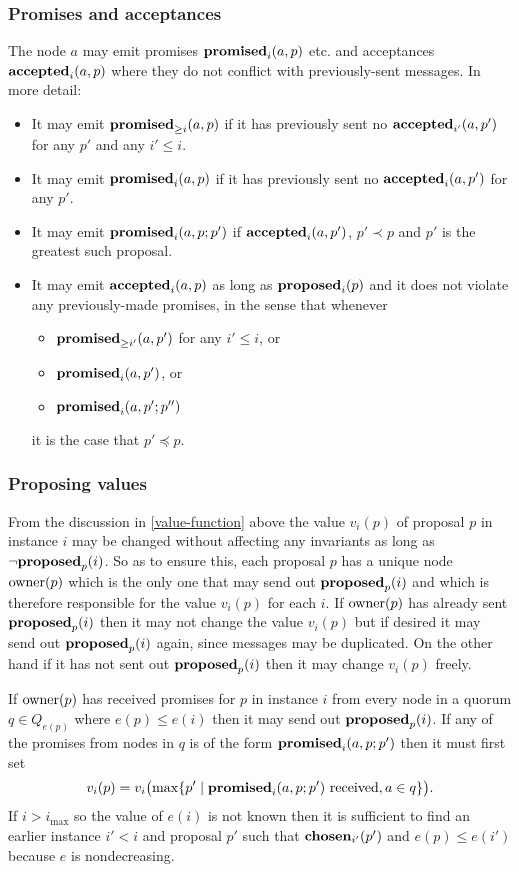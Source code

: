 \documentclass[journal]{IEEEtran}
\begin{document}
\subsubsection{Promises and acceptances} The node $a$ may emit promises
$\mathbf{promised}_{i}(a,p)$ etc. and acceptances $\mathbf{accepted}_{i}(a,p)$ where they do not
conflict with previously-sent messages. In more detail: \begin{itemize} \item
It may emit $\mathbf{promised}_{\ge i}(a,p)$ if it has previously sent no $\mathbf{accepted}_{i'}(a,p')$
for any $p'$ and any $i' \le i$. \item It may emit $\mathbf{promised}_{i}(a,p)$ if it has
previously sent no $\mathbf{accepted}_{i}(a,p')$ for any $p'$. \item It may emit
$\mathbf{promised}_{i}(a,p;p')$ if $\mathbf{accepted}_{i}(a,p')$, $p' \prec p$ and $p'$ is the
greatest such proposal. \item It may emit $\mathbf{accepted}_{i}(a,p)$ as long as
$\mathbf{proposed}_{i}(p)$ and it does not violate any previously-made promises, in the
sense that whenever \begin{itemize} \item $\mathbf{promised}_{\ge i'}(a,p')$ for any $i' \le
i$, or \item $\mathbf{promised}_{i}(a,p')$, or \item $\mathbf{promised}_{i}(a,p';p'')$\end{itemize}
it is the case that $p' \preceq p$. \end{itemize}

\subsubsection{Proposing values} From the discussion in \ref{value-function}
above the value $v_i(p)$ of proposal $p$ in instance $i$ may be changed without
affecting any invariants as long as $\neg\mathbf{proposed}_{p}(i)$. So as to ensure this,
each proposal $p$ has a unique node $\mathrm{owner}(p)$ which is the only one that may
send out $\mathbf{proposed}_{p}(i)$ and which is therefore responsible for the value
$v_i(p)$ for each $i$.  If $\mathrm{owner}(p)$ has already sent $\mathbf{proposed}_{p}(i)$ then it
may not change the value $v_i(p)$ but if desired it may send out $\mathbf{proposed}_{p}(i)$
again, since messages may be duplicated. On the other hand if it has not sent
out $\mathbf{proposed}_{p}(i)$ then it may change $v_i(p)$ freely.

If $\mathrm{owner}(p)$ has received promises for $p$ in instance $i$ from every node in
a quorum $q \in Q_{e(p)}$ where $e(p) \le e(i)$ then it may send out
$\mathbf{proposed}_{p}(i)$. If any of the promises from nodes in $q$ is of the form
$\mathbf{promised}_{i}(a,p;p')$ then it must first set \[v_i(p) = v_i\bigl(\mathrm{max}
\{p' \mid \mathbf{promised}_{i}(a,p;p') \textrm{ received}, a \in q \}\bigr).\] If $i >
i_\mathrm{max}$ so the value of $e(i)$ is not known then it is sufficient to
find an earlier instance $i' < i$ and proposal $p'$ such that $\mathbf{chosen}_{i'}(p')$
and $e(p) \le e(i')$ because $e$ is nondecreasing.
\end{document}

